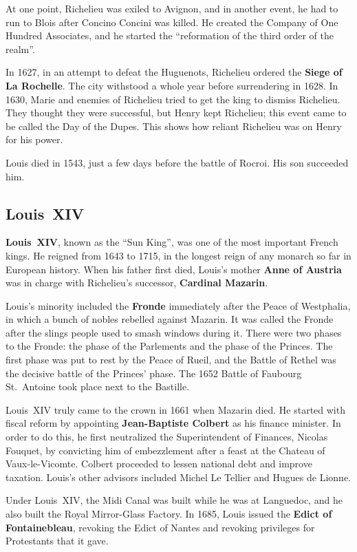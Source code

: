At one point, Richelieu was exiled to Avignon,
and in another event, he had to run to Blois after Concino Concini was killed.
He created the Company of One Hundred Associates,
and he started the ``reformation of the third order of the realm''.

In 1627, in an attempt to defeat the Huguenots, Richelieu ordered the \textbf{Siege of La Rochelle}.
The city withstood a whole year before surrendering in 1628.
In 1630, Marie and enemies of Richelieu tried to get the king to dismiss Richelieu.
They thought they were successful, but Henry kept Richelieu;
this event came to be called the Day of the Dupes.
This shows how reliant Richelieu was on Henry for his power.

Louis died in 1543, just a few days before the battle of Rocroi.
His son succeeded him.

\subsection*{Louis~XIV}

\textbf{Louis~XIV}, known as the ``Sun King'', was one of the most important French kings.
He reigned from 1643 to 1715, in the longest reign of any monarch so far in European history.
When his father first died,
Louis's mother \textbf{Anne of Austria} was in charge with Richelieu's successor, \textbf{Cardinal Mazarin}.

Louis's minority included the \textbf{Fronde} immediately after the Peace of Westphalia,
in which a bunch of nobles rebelled against Mazarin.
It was called the Fronde after the slings people used to smash windows during it.
There were two phases to the Fronde: the phase of the Parlements and the phase of the Princes.
The first phase was put to rest by the Peace of Rueil,
and the Battle of Rethel was the decisive battle of the Princes' phase.
The 1652 Battle of Faubourg St.\ Antoine took place next to the Bastille.

Louis~XIV truly came to the crown in 1661 when Mazarin died.
He started with fiscal reform by appointing \textbf{Jean-Baptiste Colbert} as his finance minister.
In order to do this, he first neutralized the Superintendent of Finances, Nicolas Fouquet,
by convicting him of embezzlement after a feast at the Chateau of Vaux-le-Vicomte.
Colbert proceeded to lessen national debt and improve taxation.
Louis's other advisors included Michel Le Tellier and Hugues de Lionne.

Under Louis~XIV, the Midi Canal was built while he was at Languedoc,
and he also built the Royal Mirror-Glass Factory.
In 1685, Louis issued the \textbf{Edict of Fontainebleau},
revoking the Edict of Nantes and revoking privileges for Protestants that it gave.

